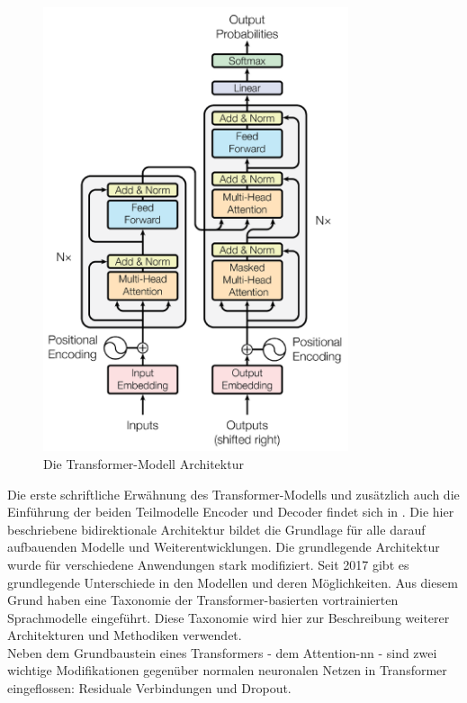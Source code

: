 \begin{figure}[ht]
    \centering
    \includegraphics[width=0.8\textwidth]{zeichnungen/transformer.png}
    \caption{Die Transformer-Modell Architektur \citep{attention}}
    \label{bild:transformer}
\end{figure}

Die erste schriftliche Erwähnung des Transformer-Modells und zusätzlich auch die Einführung der beiden Teilmodelle Encoder und Decoder findet sich in \citet{attention}.
Die hier beschriebene bidirektionale Architektur bildet die Grundlage für alle darauf aufbauenden Modelle und Weiterentwicklungen.
Die grundlegende Architektur wurde für verschiedene Anwendungen stark modifiziert.
Seit 2017 gibt es grundlegende Unterschiede in den Modellen und deren Möglichkeiten.
Aus diesem Grund haben \citet{ammus} eine Taxonomie der Transformer-basierten vortrainierten Sprachmodelle eingeführt.
Diese Taxonomie wird hier zur Beschreibung weiterer Architekturen und Methodiken verwendet.\\

Neben dem Grundbaustein eines Transformers - dem Attention-\ac{nn} - sind zwei wichtige Modifikationen gegenüber normalen neuronalen Netzen in Transformer eingeflossen: Residuale Verbindungen und Dropout.\\

